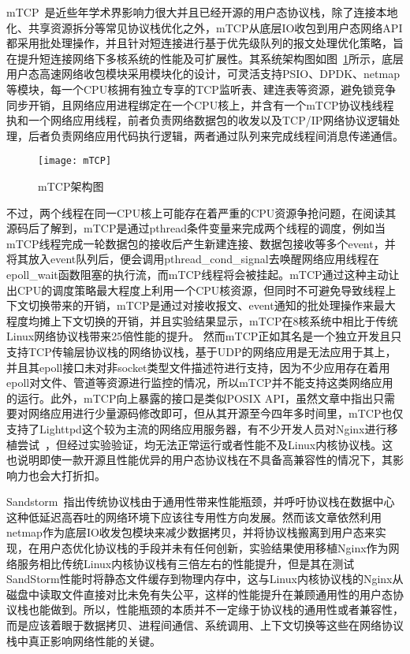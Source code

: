 mTCP~\cite{mTCP}是近些年学术界影响力很大并且已经开源的用户态协议栈，除了连接本地化、共享资源拆分等常见协议栈优化之外，mTCP从底层IO收包到用户态网络API都采用批处理操作，并且针对短连接进行基于优先级队列的报文处理优化策略，旨在提升短连接网络下多核系统的性能及可扩展性。其系统架构图如图~\ref{fig:mTCP}所示，底层用户态高速网络收包模块采用模块化的设计，可灵活支持PSIO、DPDK、netmap等模块，每一个CPU核拥有独立专享的TCP监听表、建连表等资源，避免锁竞争同步开销，且网络应用进程绑定在一个CPU核上，并含有一个mTCP协议栈线程执和一个网络应用线程，前者负责网络数据包的收发以及TCP/IP网络协议逻辑处理，后者负责网络应用代码执行逻辑，两者通过队列来完成线程间消息传递通信。
\vspace{-10pt}
\begin{figure}[H] %
  \centering
  \texttt{[image: mTCP]}
  \caption{mTCP架构图}
  \label{fig:mTCP}
\end{figure}
\vspace{-10pt}
不过，两个线程在同一CPU核上可能存在着严重的CPU资源争抢问题，在阅读其源码后了解到，mTCP是通过pthread条件变量来完成两个线程的调度，例如当mTCP线程完成一轮数据包的接收后产生新建连接、数据包接收等多个event，并将其放入event队列后，便会调用pthread\_cond\_signal去唤醒网络应用线程在epoll\_wait函数阻塞的执行流，而mTCP线程将会被挂起。mTCP通过这种主动让出CPU的调度策略最大程度上利用一个CPU核资源，但同时不可避免导致线程上下文切换带来的开销，mTCP是通过对接收报文、event通知的批处理操作来最大程度均摊上下文切换的开销，并且实验结果显示，mTCP在8核系统中相比于传统Linux网络协议栈带来25倍性能的提升。
然而mTCP正如其名是一个独立开发且只支持TCP传输层协议栈的网络协议栈，基于UDP的网络应用是无法应用于其上，并且其epoll接口未对非socket类型文件描述符进行支持，因为不少应用存在着用epoll对文件、管道等资源进行监控的情况，所以mTCP并不能支持这类网络应用的运行。此外，mTCP向上暴露的接口是类似POSIX API，虽然文章中指出只需要对网络应用进行少量源码修改即可，但从其开源至今四年多时间里，mTCP也仅支持了Lighttpd这个较为主流的网络应用服务器，有不少开发人员对Nginx进行移植尝试~\cite{nginxmtcp1,nginxmtcp2}，但经过实验验证，均无法正常运行或者性能不及Linux内核协议栈。这也说明即使一款开源且性能优异的用户态协议栈在不具备高兼容性的情况下，其影响力也会大打折扣。

Sandstorm~\cite{Sandstorm}指出传统协议栈由于通用性带来性能瓶颈，并呼吁协议栈在数据中心这种低延迟高吞吐的网络环境下应该往专用性方向发展。然而该文章依然利用netmap作为底层IO收发包模块来减少数据拷贝，并将协议栈搬离到用户态来实现，在用户态优化协议栈的手段并未有任何创新，实验结果使用移植Nginx作为网络服务相比传统Linux内核协议栈有三倍左右的性能提升，但是其在测试SandStorm性能时将静态文件缓存到物理内存中，这与Linux内核协议栈的Nginx从磁盘中读取文件直接对比未免有失公平，这样的性能提升在兼顾通用性的用户态协议栈也能做到。所以，性能瓶颈的本质并不一定缘于协议栈的通用性或者兼容性，而是应该着眼于数据拷贝、进程间通信、系统调用、上下文切换等这些在网络协议栈中真正影响网络性能的关键。


